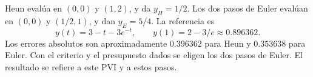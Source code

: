 Heun evalúa en \((0,0)\) y \((1,2)\), y da \(y_H=1/2\). Los dos pasos de Euler evalúan en \((0,0)\) y \((1/2,1)\), y dan \(y_E=5/4\). La referencia es
\[
y(t)=3-t-3e^{-t},\qquad y(1)=2-3/e\approx0.896362.
\]
Los errores absolutos son aproximadamente \(0.396362\) para Heun y \(0.353638\) para Euler. Con el criterio y el presupuesto dados se eligen los dos pasos de Euler. El resultado se refiere a este PVI y a estos pasos.
